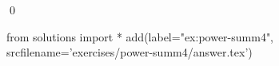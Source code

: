 
\begin{ex} 
  \label{ex:power-summ4}
  
  \qed
\end{ex} 
\begin{python0}
from solutions import *
add(label="ex:power-summ4",
    srcfilename='exercises/power-summ4/answer.tex') 
\end{python0}
